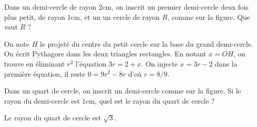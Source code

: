 \begin{exo}
Dans un demi-cercle de rayon $2$cm, on inscrit un premier demi-cercle deux fois plus petit, de rayon $1$cm, et un un cercle de rayon $R$, comme sur la figure.
Que vaut $R$ ?
\begin{center}
\end{center}
\begin{hint}

\end{hint}
\begin{sol}
On note $H$ le projeté du centre du petit cercle sur la base du grand demi-cercle.
On écrit Pythagore dans les deux triangles rectangles.
En notant $x=OH$, on trouve en éliminant $r^2$ l'équation $3r=2+x$.
On  injecte $x=3r-2$ dans la première équation, il reste $0=9r^2-8r$ d'où $r=8/9$.

\end{sol}
\end{exo}








\begin{exo}
Dans un quart de cercle, on inscrit un demi-cercle comme sur la figure.
Si le rayon du demi-cercle est $1$cm, quel est le rayon du quart de cercle ?
\begin{center}
\end{center}
\begin{sol}
Le rayon du quart de cercle est $\sqrt 3$.
\end{sol}
\end{exo}




